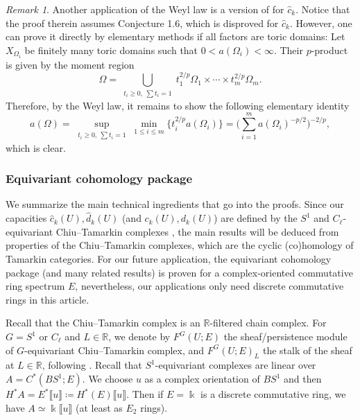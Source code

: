 \documentclass[11pt]{amsart}
\numberwithin{equation}{section}
\theoremstyle{plain}
\theoremstyle{definition}
\theoremstyle{remark}
\newtheorem{RMK}[rmk]{Remark}
\newcommand{\bR} { {\mathbb{R}}}
\newcommand{\fpw}[1]{{\llbracket #1\rrbracket}}
\begin{document}
\begin{RMK}Another application of the Weyl law is a version of \cite[Theorem 1.9]{HaimKislevOstrover2023} for $\widehat{c}_k$. Notice that the proof therein assumes Conjecture 1.6, which is disproved for $\widehat{c}_k$. However, one can prove it directly by elementary methods if all factors are toric domains: Let $X_{\Omega_i}$ be finitely many toric domains such that $0<a(\Omega_i)<\infty$. Their $p$-product is given by the moment region
\[\Omega=\bigcup_{\substack{t_i\geq 0,~\sum t_i=1}} t_1^{2/p} \Omega_1\times \cdots \times t_m^{2/p} \Omega_m.\]
Therefore, by the Weyl law, it remains to show the following elementary identity
\[a(\Omega)=\sup_{\substack{t_i\geq 0,~\sum t_i=1}} \min_{1\leq i\leq m} \{t_i^{2/p} a(\Omega_i)\}=\Big(\sum_{i=1}^m a(\Omega_i)^{-p/2}\Big)^{-2/p},\]
which is clear.
\end{RMK}





\subsubsection{Equivariant cohomology package}
We summarize the main technical ingredients that go into the proofs. Since our capacities $\widehat{c}_k(U),\widehat{d}_k(U)$ (and $c_k(U),{d}_k(U)$) are defined by the $S^1$ and $C_\ell$-equivariant Chiu--Tamarkin complexes \cite{chiu2017,Capacities2021,CyclicZHANG}, the main results will be deduced from properties of the Chiu--Tamarkin complexes, which are the cyclic (co)homology of Tamarkin categories. For our future application, the equivariant cohomology package (and many related results) is proven for a complex-oriented commutative ring spectrum $E$, nevertheless, our applications only need discrete commutative rings in this article.

Recall that the Chiu--Tamarkin complex is an $\bR$-filtered chain complex. For $G = S^1$ or $C_\ell$ and $L \in \bR$, we denote by $F^G (U; E)$ the sheaf/persistence module of $G$-equivariant Chiu--Tamarkin complex, and $F^G (U; E)_L$ the stalk of the sheaf at $L\in \bR$, following \cite{Capacities2021,CyclicZHANG}. Recall that $S^1$-equivariant complexes are linear over $A= C^*(BS^1; E)$. We choose $u$ as a complex orientation of $BS^1$ and then $H^*A= E^*\fpw{u}\coloneqq H^{*}(E)\fpw{u}$. Then if $E=\Bbbk$ is a discrete commutative ring, we have $A\simeq \Bbbk\fpw{u}$ (at least as $E_2$ rings).
\end{document}
